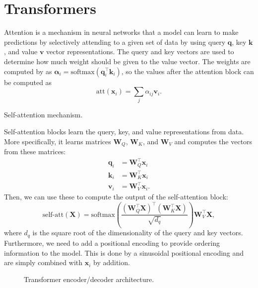 \section{Transformers} \label{sec:transformers}

Attention is a mechanism in neural networks that a model can learn to make
predictions by selectively attending to a given set of data by using query
$\bm{q}$, key $\bm{k}$, and value $\bm{v}$ vector representations. The query
and key vectors are used to determine how much weight should be given to the
value vector. The weights are computed by as
$\bm{\alpha}_i=\text{softmax}(\bm{q}_i^\top\bm{k}_i)$, so the values after the
attention block can be computed as \[
  \text{att}(\bm{x}_i) = \sum_{j} \alpha_{ij} \bm{v}_i
.\]

\begin{marginfigure}
    \centering
    \caption{Self-attention mechanism.}
    \label{fig:attention}
\end{marginfigure}

Self-attention blocks learn the query, key, and value representations from
data. More specifically, it learns matrices $\bm{W}_Q$, $\bm{W}_K$, and
$\bm{W}_V$ and computes the vectors from these matrices:
\begin{align*}
  \bm{q}_i &= \bm{W}_Q^\top \bm{x}_i \\
  \bm{k}_i &= \bm{W}_K^\top \bm{x}_i \\
  \bm{v}_i &= \bm{W}_V^\top \bm{x}_i
.\end{align*}
Then, we can use these to compute the output of the self-attention block: \[
  \text{self-att}(\bm{X}) = \text{softmax}\left( \frac{(\bm{W}_Q^\top\bm{X})^\top(\bm{W}_K^\top\bm{X})}{\sqrt{d_q}} \right) \bm{W}_V^\top\bm{X}
,\]
where $d_q$ is the square root of the dimensionality of the query and key
vectors. Furthermore, we need to add a positional encoding to provide
ordering information to the model. This is done by a sinusoidal positional encoding and
are simply combined with $\bm{x}_i$ by addition.

\begin{figure}[ht]
    \centering
    \caption{Transformer encoder/decoder architecture.}
    \label{fig:transformer}
\end{figure}

